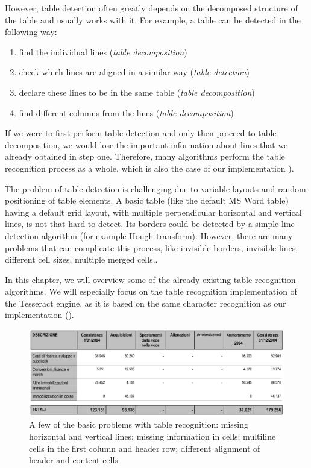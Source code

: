 However, table detection often greatly depends on the decomposed structure of the table and usually works with it. For example, a table can be detected in the following way:

\begin{enumerate}
    \item find the individual lines (\emph{table decomposition})
    \item check which lines are aligned in a similar way (\emph{table detection})
    \item declare these lines to be in the same table (\emph{table decomposition})
    \item find different columns from the lines (\emph{table decomposition})
\end{enumerate}

If we were to first perform table detection and only then proceed to table decomposition, we would lose the important information about lines that we already obtained in step one. Therefore, many algorithms perform the table recognition process as a whole, which is also the case of our implementation ).

The problem of table detection is challenging due to variable layouts and random positioning of table elements. A basic table (like the default MS Word table) having a default grid layout, with multiple perpendicular horizontal and vertical lines, is not that hard to detect. Its borders could be detected by a simple line detection algorithm (for example Hough transform). However, there are many problems that can complicate this process, like invisible borders, invisible lines, different cell sizes, multiple merged cells..

In this chapter, we will overview some of the already existing table recognition algorithms. We will especially focus on the table recognition implementation of the Tesseract engine, as it is based on the same character recognition as our implementation (). 

\begin{figure}[H]
\centering
\includegraphics[width=0.7\linewidth]{img/recognitionProblematic.jpg}
\caption{A few of the basic problems with table recognition: missing horizontal and vertical lines; missing information in cells; multiline cells in the first column and header row; different alignment of header and content cells } \label{fig:1a}
\end{figure}

